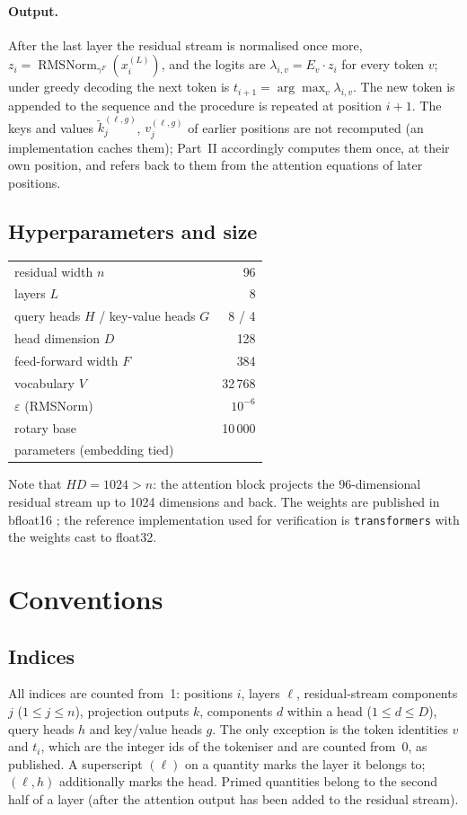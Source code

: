 \documentclass[a4paper,10pt]{article}
\newcommand{\RMS}{\operatorname{RMSNorm}}
\begin{document}
\paragraph{Output.}
After the last layer the residual stream is normalised once more, $z_i = \RMS_{\gamma^F}(x^{(L)}_i)$, and the logits are $\lambda_{i,v} = E_v\cdot z_i$ for every token $v$; under greedy decoding the next token is $t_{i+1}=\arg\max_v\lambda_{i,v}$.
The new token is appended to the sequence and the procedure is repeated at position $i+1$.
The keys and values $\tilde k^{(\ell,g)}_j$, $v^{(\ell,g)}_j$ of earlier positions are not recomputed (an implementation caches them); Part~II accordingly computes them once, at their own position, and refers back to them from the attention equations of later positions.

\subsection{Hyperparameters and size}

\begin{center}
\begin{tabular}{lr}
\toprule
residual width $n$ & 96 \\
layers $L$ & 8 \\
query heads $H$ / key-value heads $G$ & 8 / 4 \\
head dimension $D$ & 128 \\
feed-forward width $F$ & 384 \\
vocabulary $V$ & 32\,768 \\
$\varepsilon$ (RMSNorm) & $10^{-6}$ \\
rotary base & 10\,000 \\
parameters (embedding tied) & \NumParams{} \\
\bottomrule
\end{tabular}
\end{center}
Note that $HD=1024>n$: the attention block projects the 96-dimensional residual stream up to 1024 dimensions and back.
The weights are published in bfloat16 \citep{c10x2025checkpoint}; the reference implementation used for verification is \texttt{transformers} \citep{wolf2020transformers} with the weights cast to float32.

\section{Conventions}
\label{sec:conventions}

\subsection{Indices}
All indices are counted from~1: positions $i$, layers $\ell$, residual-stream components $j$ ($1\le j\le n$), projection outputs $k$, components $d$ within a head ($1\le d\le D$), query heads $h$ and key/value heads $g$.
The only exception is the token identities $v$ and $t_i$, which are the integer ids of the tokeniser and are counted from~0, as published.
A superscript $(\ell)$ on a quantity marks the layer it belongs to; $(\ell,h)$ additionally marks the head.
Primed quantities belong to the second half of a layer (after the attention output has been added to the residual stream).
\end{document}
